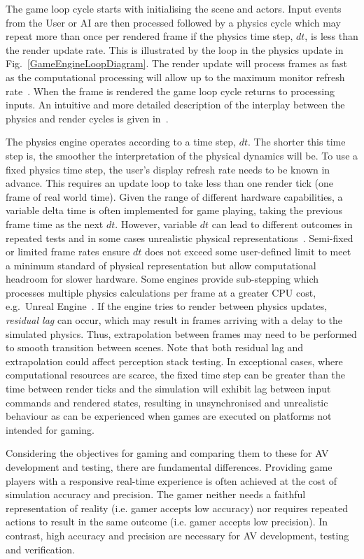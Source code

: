 The game loop cycle starts with initialising the scene and actors. Input events from the User or AI are then processed followed by a physics cycle which may repeat more than once per rendered frame if the physics time step, $dt$, is less than the render update rate. This is illustrated by the loop in the physics update in Fig.~\ref{GameEngineLoopDiagram}. The render update will process frames as fast as the computational processing will allow up to the maximum monitor refresh rate~\cite{unity_framerates}. When the frame is rendered the game loop cycle returns to processing inputs. An intuitive and  more detailed description of the interplay between the physics and render cycles is given in~\cite{JohnAustinUnity}.

The physics engine operates according to a time step, $dt$. The shorter this time step is, the smoother the interpretation of the physical dynamics will be. To use a fixed physics time step, the user's display refresh rate needs to be known in advance. This requires an update loop to take less than one render tick (one frame of real world time). Given the range of different hardware capabilities, a variable delta time is often implemented for game playing, taking the previous frame time as the next $dt$. However, variable $dt$ can lead to different outcomes in repeated tests and in some cases unrealistic physical representations~\cite{gaffer}. 
%
Semi-fixed or limited frame rates ensure $dt$ does not exceed some user-defined limit to meet a minimum standard of physical representation but allow computational headroom for slower hardware. Some engines provide sub-stepping which processes multiple physics calculations per frame at a greater CPU cost, e.g.\ Unreal Engine~\cite{UE4_substepping}. If the engine tries to render between physics updates, \textit{residual lag} can occur, which may result in frames arriving with a delay to the simulated physics. Thus, extrapolation between frames may need to be performed to smooth transition between scenes. Note that both residual lag and extrapolation could affect perception stack testing. In exceptional cases, where computational resources are scarce, the fixed time step can be greater than the time between render ticks and the simulation will exhibit lag between input commands and rendered states, resulting in unsynchronised and unrealistic behaviour as can be experienced when games are executed on platforms not intended for gaming. 

Considering the objectives for gaming and comparing them to these for AV development and testing, there are fundamental differences. Providing game players with a responsive real-time experience is often achieved at the cost of simulation accuracy and precision.
% 
The gamer neither needs a faithful representation of reality (i.e. gamer accepts low accuracy) nor requires repeated actions to result in the same outcome (i.e. gamer accepts low precision). In contrast, high accuracy and precision are necessary for AV development, testing and verification.

